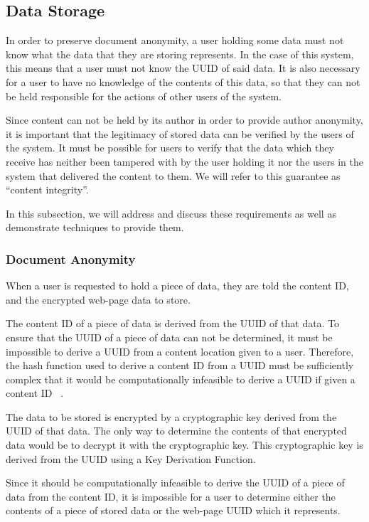 
\subsection{Data Storage}


In order to preserve document anonymity, a user holding some data must not know what the data that they are storing represents.
In the case of this system, this means that a user must not know the UUID of said data.
It is also necessary for a user to have no knowledge of the contents of this data, so that they can not be held
responsible for the actions of other users of the system.

Since content can not be held by its author in order to provide author anonymity, it is important that the legitimacy of stored
data can be verified by the users of the system. It must be possible for users to verify that the data which they receive has
neither been tampered with by the user holding it nor the users in the system that delivered the content to them.
We will refer to this guarantee as ``content integrity''.

In this subsection, we will address and discuss these requirements as well as demonstrate techniques to provide them.

\subsubsection{Document Anonymity}

When a user is requested to hold a piece of data, they are told the content ID, and the encrypted web-page data to store.

The content ID of a piece of data is derived from the UUID of that data. To ensure that the UUID of a piece of data
can not be determined, it must be impossible to derive a UUID from a content location given to a user.
Therefore, the hash function used to derive a content ID from a UUID must be sufficiently complex that it would be
computationally infeasible to derive a UUID if given a content ID ~\cite{sha1}.

The data to be stored is encrypted by a cryptographic key derived from the UUID of that data. The only way to determine
the contents of that encrypted data would be to decrypt it with the cryptographic key.
This cryptographic key is derived from the UUID using a Key Derivation Function.

Since it should be computationally infeasible to derive the UUID of a piece of data from the content ID, it is impossible
for a user to determine either the contents of a piece of stored data or the web-page UUID which it represents.

